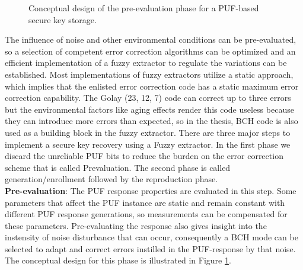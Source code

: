 \begin{figure}[htp]
\centering
{}
\caption{Conceptual design of the pre-evaluation phase for a PUF-based secure key storage.}
\label{img:fz_1}
\end{figure}
The influence of noise and other environmental conditions can be pre-evaluated, so a selection of competent error correction algorithms can be optimized and an efficient implementation of a fuzzy extractor to regulate the variations can be established. Most implementations of fuzzy extractors utilize a static approach, which implies that the enlisted error correction code has a static maximum error
correction capability. The Golay (23, 12, 7) code can correct up to three errors but the environmental factors like aging effects render this code useless because they can introduce more errors than expected, so in the thesis, BCH code is also used as a building block in the fuzzy extractor. There are three major steps to implement a secure key recovery using a Fuzzy extractor. In the first phase we discard the unreliable PUF bits to reduce the burden on the error correction scheme that is called
Prevaluation. The second phase is called generation/enrollment followed by the reproduction phase.\\

\textbf{Pre-evaluation}: The PUF response properties are evaluated in this step. Some parameters that affect the PUF instance are static and remain constant with different PUF response generations, so measurements can be compensated for these parameters. Pre-evaluating the response also gives insight into the instensity of noise disturbance that can occur, consequently a BCH mode can be selected to adapt and correct errors instilled in the PUF-response by that noise. The conceptual
design for this phase is illustrated in Figure \ref{img:fz_1}.\\


